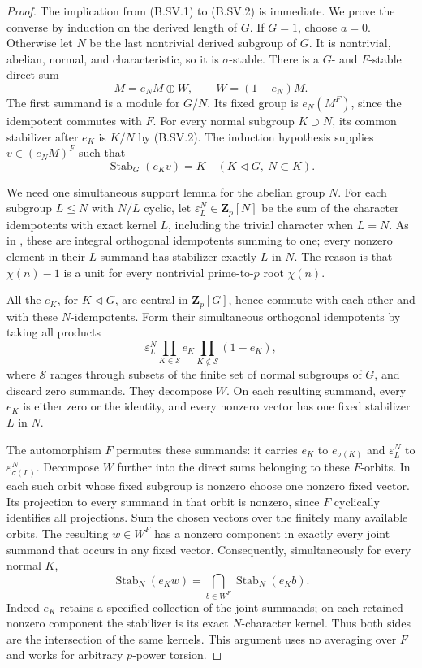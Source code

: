 \begin{proof}
The implication from (B.SV.1) to (B.SV.2) is immediate.
We prove the converse by induction on the derived length
of $G$. If $G=1$, choose $a=0$. Otherwise let $N$ be the
last nontrivial derived subgroup of $G$. It is nontrivial,
abelian, normal, and characteristic, so it is $\sigma$-stable.
There is a $G$- and $F$-stable direct sum
\[
                    M=e_NM\oplus W,\qquad W=(1-e_N)M.          \tag{B.SV.3}
\]
The first summand is a module for $G/N$. Its fixed group is
$e_N(M^F)$, since the idempotent commutes with $F$.
For every normal subgroup $K\supset N$, its common
stabilizer after $e_K$ is $K/N$ by (B.SV.2). The induction
hypothesis supplies $v\in(e_NM)^F$ such that
\[
                \operatorname{Stab}_G(e_Kv)=K
                        \quad(K\triangleleft G,\ N\subset K).
                                                                  \tag{B.SV.4}
\]

We need one simultaneous support lemma for the abelian group
$N$. For each subgroup $L\le N$ with $N/L$ cyclic, let
$\varepsilon_L^N\in\mathbf Z_p[N]$ be the sum of the
character idempotents with exact kernel $L$, including the
trivial character when $L=N$. As in ,
these are integral orthogonal idempotents summing to one;
every nonzero element in their $L$-summand has stabilizer
exactly $L$ in $N$. The reason is that $\chi(n)-1$ is a
unit for every nontrivial prime-to-$p$ root $\chi(n)$.

All the $e_K$, for $K\triangleleft G$, are central in
$\mathbf Z_p[G]$, hence commute with each other and with
these $N$-idempotents. Form their simultaneous orthogonal
idempotents by taking all products
\[
 \varepsilon_L^N
       \prod_{K\in\mathcal S}e_K
       \prod_{K\notin\mathcal S}(1-e_K),                       \tag{B.SV.5}
\]
where $\mathcal S$ ranges through subsets of the finite set
of normal subgroups of $G$, and discard zero summands.
They decompose $W$. On each resulting summand, every $e_K$
is either zero or the identity, and every nonzero vector has
one fixed stabilizer $L$ in $N$.

The automorphism $F$ permutes these summands: it carries
$e_K$ to $e_{\sigma(K)}$ and $\varepsilon_L^N$ to
$\varepsilon_{\sigma(L)}^N$. Decompose $W$ further into
the direct sums belonging to these $F$-orbits. In each such
orbit whose fixed subgroup is nonzero choose one nonzero
fixed vector. Its projection to every summand in that orbit
is nonzero, since $F$ cyclically identifies all projections.
Sum the chosen vectors over the finitely many available
orbits. The resulting $w\in W^F$ has a nonzero component
in exactly every joint summand that occurs in any fixed
vector. Consequently, simultaneously for every normal $K$,
\[
 \operatorname{Stab}_N(e_Kw)
       =\bigcap_{b\in W^F}\operatorname{Stab}_N(e_Kb).           \tag{B.SV.6}
\]
Indeed $e_K$ retains a specified collection of the joint
summands; on each retained nonzero component the stabilizer
is its exact $N$-character kernel. Thus both sides are the
intersection of the same kernels. This argument uses no
averaging over $F$ and works for arbitrary $p$-power torsion.


\end{proof}
